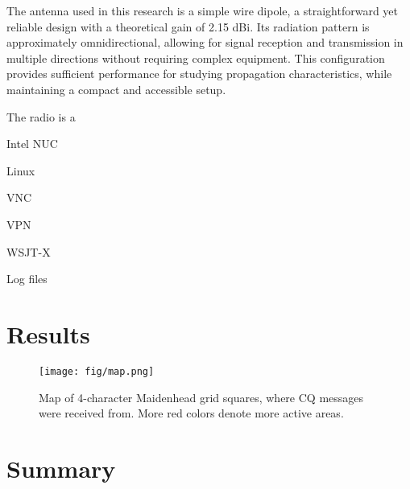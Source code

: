 \documentclass[conference]{IEEEtran}
\begin{document}
The antenna used in this research is a simple wire dipole, a straightforward
yet reliable design with a theoretical gain of 2.15 dBi. Its radiation pattern
is approximately omnidirectional, allowing for signal reception and
transmission in multiple directions without requiring complex equipment. This
configuration provides sufficient performance for studying propagation
characteristics, while maintaining a compact and accessible setup.


The radio is a 

Intel NUC

Linux

VNC

VPN

WSJT-X

Log files


\section{Results}

\begin{figure}[htbp]
	\centering
	\texttt{[image: fig/map.png]}
	\caption{Map of 4-character Maidenhead grid squares, where CQ messages were received from.
  More red colors denote more active areas.}
	\label{fig-dummy}
\end{figure}

\section{Summary}




\end{document}
